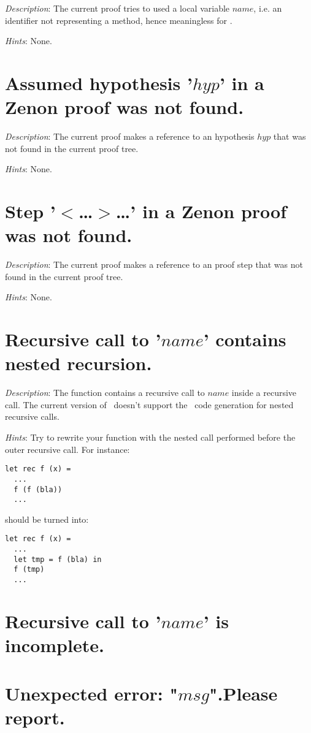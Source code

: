 {\em Description}: The current proof tries to used a local variable
$name$, i.e. an identifier not representing a method, hence
meaningless for \zenon.

{\em Hints}: None.



\section*{Assumed hypothesis '$hyp$' in a Zenon proof was not found.}

{\em Description}: The current proof makes a reference to an
hypothesis $hyp$ that was not found in the current proof tree.

{\em Hints}: None.



\section*{Step '$<$\ldots$>$\ldots' in a Zenon proof was not found.}

{\em Description}: The current proof makes a reference to an
proof step that was not found in the current proof tree.

{\em Hints}: None.


\section*{Recursive call to '$name$' contains nested recursion.}

{\em Description}: The function contains a recursive call to $name$
inside a recursive call. The current version of \focal\ doesn't
support the \coq\ code generation for nested recursive calls.

{\em Hints}: Try to rewrite your function with the nested call
performed before the outer recursive call. For instance:
{\scriptsize
\begin{lstlisting}
let rec f (x) =
  ...
  f (f (bla))
  ...
\end{lstlisting}
}
should be turned into:
{\scriptsize
\begin{lstlisting}
let rec f (x) =
  ...
  let tmp = f (bla) in
  f (tmp)
  ...
\end{lstlisting}
}



\section*{Recursive call to '$name$' is incomplete.}



\section*{Unexpected error: "$msg$".Please report.}
